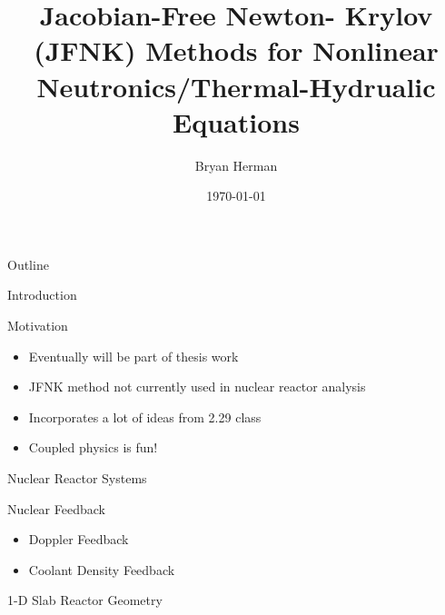 \documentclass{beamer}
\title[JFNK Methods for Coupled Nonlinear Systems]{Jacobian-Free Newton-
Krylov (JFNK) Methods for Nonlinear Neutronics/Thermal-Hydrualic Equations}
\author[]{Bryan Herman}
\institute[\insertpagenumber]{}
\date{\today}
\begin{document}

\frame{\titlepage}

\begin{frame}{Outline}
  \tableofcontents
\end{frame}

\begin{section}{Introduction}

\begin{frame}{Motivation}

\begin{itemize}

	\item Eventually will be part of thesis work
	\vfill\item JFNK method not currently used in nuclear reactor 
		analysis
	\vfill\item Incorporates a lot of ideas from 2.29 class
	\vfill\item Coupled physics is fun!

\end{itemize}

\end{frame}
\begin{frame}{Nuclear Reactor Systems}
	\scalebox{0.5}{}
	\vfill
\end{frame}
\begin{frame}{Nuclear Feedback}
\begin{center}
	\scalebox{0.5}{}
	\begin{itemize}
		\item Doppler Feedback
		\item Coolant Density Feedback
	\end{itemize}
\end{center}
\end{frame}
\begin{frame}{1-D Slab Reactor Geometry}

\end{frame}
\end{section}
\end{document}
